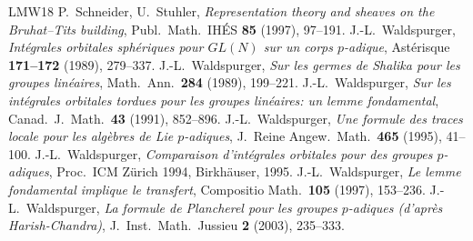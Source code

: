 \documentclass[12pt,letterpaper]{article}
\numberwithin{equation}{section}
\theoremstyle{plain}
\theoremstyle{remark}
\theoremstyle{plain}
\theoremstyle{definition}
\theoremstyle{remark}
\theoremstyle{remark}
\begin{document}
\begin{thebibliography}{LMW18}
 P.~Schneider, U.~Stuhler, \emph{Representation theory and sheaves on the Bruhat--Tits building}, Publ.\ Math.\ IH\'ES \textbf{85} (1997), 97--191.
 J.-L.~Waldspurger, \emph{Int\'egrales orbitales sph\'eriques pour $GL(N)$ sur un corps $p$-adique}, Ast\'erisque \textbf{171--172} (1989), 279--337.
 J.-L.~Waldspurger, \emph{Sur les germes de Shalika pour les groupes lin\'eaires}, Math.\ Ann.\ \textbf{284} (1989), 199--221.
 J.-L.~Waldspurger, \emph{Sur les int\'egrales orbitales tordues pour les groupes lin\'eaires: un lemme fondamental}, Canad.\ J.\ Math.\ \textbf{43} (1991), 852--896.
 J.-L.~Waldspurger, \emph{Une formule des traces locale pour les alg\`ebres de Lie $p$-adiques}, J.\ Reine Angew.\ Math.\ \textbf{465} (1995), 41--100.
 J.-L.~Waldspurger, \emph{Comparaison d'int\'egrales orbitales pour des groupes $p$-adiques}, Proc.\ ICM Z\"urich 1994, Birkh\"auser, 1995.
 J.-L.~Waldspurger, \emph{Le lemme fondamental implique le transfert}, Compositio Math.\ \textbf{105} (1997), 153--236.
 J.-L.~Waldspurger, \emph{La formule de Plancherel pour les groupes $p$-adiques (d'apr\`es Harish-Chandra)}, J.\ Inst.\ Math.\ Jussieu \textbf{2} (2003), 235--333.
\end{thebibliography}
\end{document}
